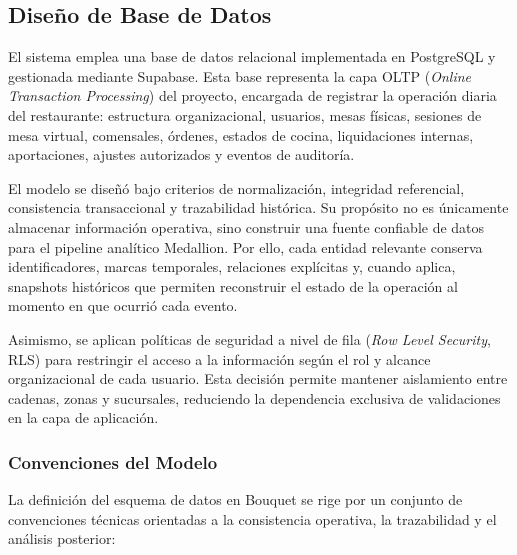\newpage
\subsection{Diseño de Base de Datos}

El sistema emplea una base de datos relacional implementada en PostgreSQL y gestionada
mediante Supabase. Esta base representa la capa OLTP (\textit{Online Transaction
Processing}) del proyecto, encargada de registrar la operación diaria del restaurante:
estructura organizacional, usuarios, mesas físicas, sesiones de mesa virtual, comensales,
órdenes, estados de cocina, liquidaciones internas, aportaciones, ajustes autorizados y
eventos de auditoría.

El modelo se diseñó bajo criterios de normalización, integridad referencial, consistencia
transaccional y trazabilidad histórica. Su propósito no es únicamente almacenar información
operativa, sino construir una fuente confiable de datos para el pipeline analítico
Medallion. Por ello, cada entidad relevante conserva identificadores, marcas temporales,
relaciones explícitas y, cuando aplica, snapshots históricos que permiten reconstruir el
estado de la operación al momento en que ocurrió cada evento.

Asimismo, se aplican políticas de seguridad a nivel de fila (\textit{Row Level Security},
RLS) para restringir el acceso a la información según el rol y alcance organizacional de
cada usuario. Esta decisión permite mantener aislamiento entre cadenas, zonas y sucursales,
reduciendo la dependencia exclusiva de validaciones en la capa de aplicación.

\subsubsection{Convenciones del Modelo}

La definición del esquema de datos en Bouquet se rige por un conjunto de convenciones
técnicas orientadas a la consistencia operativa, la trazabilidad y el análisis posterior:

